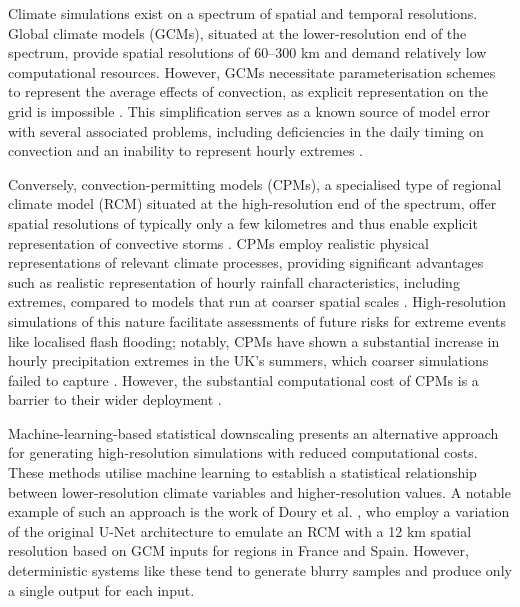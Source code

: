 \documentclass[ oneside,%
                    author={George Herbert},
                    degree={MSci},
                     title={Diffusion Models for Time-Evolving Precipitation Fields},
                  subtitle={}]{dissertation}
\begin{document}
Climate simulations exist on a spectrum of spatial and temporal resolutions. Global climate models (GCMs), situated at the lower-resolution end of the spectrum, provide spatial resolutions of 60--300 km and demand relatively low computational resources. However, GCMs necessitate parameterisation schemes to represent the average effects of convection, as explicit representation on the grid is impossible \cite{MO_CPM}. This simplification serves as a known source of model error with several associated problems, including deficiencies in the daily timing on convection and an inability to represent hourly extremes \cite{Hanel_Hourly_Precipitation_Extremes, Gregersen_Assessing_Future_Climatic_Changes}.

Conversely, convection-permitting models (CPMs), a specialised type of regional climate model (RCM) situated at the high-resolution end of the spectrum, offer spatial resolutions of typically only a few kilometres and thus enable explicit representation of convective storms \cite{MO_CPM}. CPMs employ realistic physical representations of relevant climate processes, providing significant advantages such as realistic representation of hourly rainfall characteristics, including extremes, compared to models that run at coarser spatial scales \cite{Kendon_Heavier_Summer_Downpours}. High-resolution simulations of this nature facilitate assessments of future risks for extreme events like localised flash flooding; notably, CPMs have shown a substantial increase in hourly precipitation extremes in the UK's summers, which coarser simulations failed to capture \cite{Kendon_Heavier_Summer_Downpours}. However, the substantial computational cost of CPMs is a barrier to their wider deployment \cite{MO_CPM}.

Machine-learning-based statistical downscaling presents an alternative approach for generating high-resolution simulations with reduced computational costs. These methods utilise machine learning to establish a statistical relationship between lower-resolution climate variables and higher-resolution values. A notable example of such an approach is the work of Doury et al. \cite{Doury_Regional_Climate_Model_Emulator}, who employ a variation of the original U-Net architecture \cite{Ronneberger_U-Net} to emulate an RCM with a 12 km spatial resolution based on GCM inputs for regions in France and Spain. However, deterministic systems like these tend to generate blurry samples \cite{Ravuri_Skillful_Precipitation_Nowcasting} and produce only a single output for each input.
\end{document}

